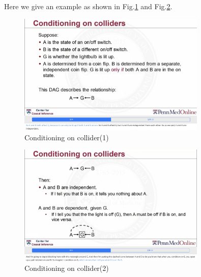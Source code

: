 \begin{ex}
	Here we give an example as shown in Fig.\ref{blockcollider1} and Fig.\ref{blockcollider2}. 
		\begin{figure}[htbp]
		\setlength{\abovecaptionskip}{0pt}     %
		\setlength{\belowcaptionskip}{10pt}
		\vspace{-0cm}  %
		\setlength{\abovecaptionskip}{-0cm}   %
		\setlength{\belowcaptionskip}{-0cm}   %
		\centering
		\includegraphics[width=0.8\textwidth]{figure/blockcollider1.jpg}
		\caption{Conditioning on collider(1)}
		\label{blockcollider1}
	\end{figure}

	\begin{figure}[htbp]
	\setlength{\abovecaptionskip}{0pt}     %
	\setlength{\belowcaptionskip}{10pt}
	\vspace{-0cm}  %
	\setlength{\abovecaptionskip}{-0cm}   %
	\setlength{\belowcaptionskip}{-0cm}   %
	\centering
	\includegraphics[width=0.8\textwidth]{figure/blockcollider2.jpg}
	\caption{Conditioning on collider(2)}
	\label{blockcollider2}
\end{figure}
	
\end{ex}

